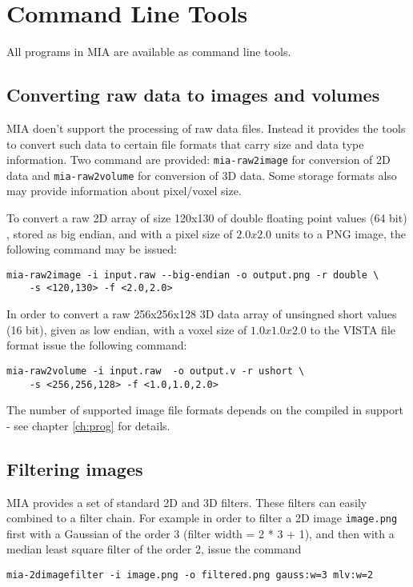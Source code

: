 \section{Command Line Tools}

All programs in MIA are available as command line tools. 

\subsection{Converting raw data to images and volumes}

MIA doen't support the processing of raw data files. 
Instead it provides the tools to convert such data to certain file formats that carry size and data type information. 
Two command are provided: \texttt{mia-raw2image} for conversion of 2D data and \texttt{mia-raw2volume} for conversion of 3D data. 
Some storage formats also may provide information about pixel/voxel size. 

To convert a raw 2D array of size 120x130 of double floating point values (64 bit) , stored as big endian, and 
  with a pixel size of $2.0 x 2.0$ units to a PNG image, the following command may be issued: 
\lstset{language=bash}
\begin{lstlisting}
mia-raw2image -i input.raw --big-endian -o output.png -r double \
	-s <120,130> -f <2.0,2.0> 
\end{lstlisting}

\noindent 
In order to convert a raw 256x256x128 3D data array of unsingned short values (16 bit), given as low endian, with a voxel size of $1.0 x 1.0 x 2.0$ 
  to the VISTA file format issue the following command: 
\begin{lstlisting}
mia-raw2volume -i input.raw  -o output.v -r ushort \
	-s <256,256,128> -f <1.0,1.0,2.0>
\end{lstlisting}

\noindent 
The number of supported image file formats depends on the compiled in support - see chapter \ref{ch:prog} for details. 

\subsection{Filtering images}

MIA provides a set of standard 2D and 3D filters. 
These filters can easily combined  to a filter chain. 
For example in order to filter a 2D image \texttt{image.png} first with a Gaussian 
  of the order 3 (filter width = 2 * 3 + 1), and then with a 
  median least square filter of the order 2, issue the command 
\begin{lstlisting}
mia-2dimagefilter -i image.png -o filtered.png gauss:w=3 mlv:w=2
\end{lstlisting}

